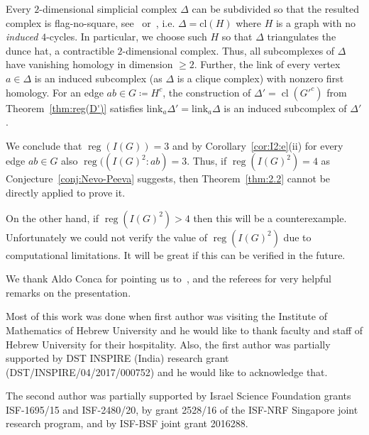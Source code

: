 \documentclass[10pt]{article}
\theoremstyle{definition}
\providecommand{\longthanks}[1]{\par\smallskip\noindent #1\par\smallskip}
\numberwithin{equation}{section}
\newcommand \reg{\operatorname{reg}}
\newcommand \cl{\operatorname{cl}}
\begin{document}
  Every $2$-dimensional simplicial complex $\Delta$ can be subdivided so that the resulted complex is flag-no-square, see~\cite{Dr} or~\cite[Lem. 2.3]{PS}, i.e. $\Delta=\text{cl}(H)$ where $H$ is a graph with no \emph{induced} $4$-cycles. In particular,
we choose such $H$ so that $\Delta$ triangulates the dunce hat, a contractible $2$-dimensional complex.
Thus, all subcomplexes of $\Delta$ have vanishing homology in dimension $\ge 2$. Further, the link of every vertex $a\in \Delta$ is an induced subcomplex (as $\Delta$ is a clique complex) with nonzero first homology. For an edge $ab\in G\coloneqq H^c$, the construction of $\Delta'=\cl(G'^c)$ from  Theorem~\ref{thm:reg(D')} satisfies $\text{link}_a \Delta'=\text{link}_a \Delta$ is an induced subcomplex of $\Delta'$.

We conclude that $\reg(I(G))=3$ and by Corollary~\ref{cor:I2:e}(ii)
for every edge $ab\in G$ also $\reg((I(G)^2:ab)=3$.
Thus, if $\reg(I(G)^2)=4$ as Conjecture~\ref{conj:Nevo-Peeva} suggests, then Theorem~\ref{thm:2.2} cannot be directly applied to prove it.

On the other hand, if $\reg(I(G)^2)>4$ then this will be a counterexample. Unfortunately we could not verify the value of $\reg(I(G)^2)$ due to computational limitations. It will be great if this can be verified in the future.


\longthanks{We thank Aldo Conca for pointing us to~\cite{Raicu}, and the referees for very helpful remarks on the presentation.

Most of this work was done when first author was visiting the Institute of Mathematics of Hebrew University and he would like to thank faculty and staff of Hebrew University for their hospitality. Also, the first author was partially supported by DST INSPIRE (India) research grant (DST/INSPIRE/04/2017/000752) and he would like to acknowledge that.

The second author was partially supported by Israel Science Foundation grants ISF-1695/15 and ISF-2480/20, by grant 2528/16 of the ISF-NRF Singapore joint research program, and by ISF-BSF joint grant 2016288.}
\end{document}
